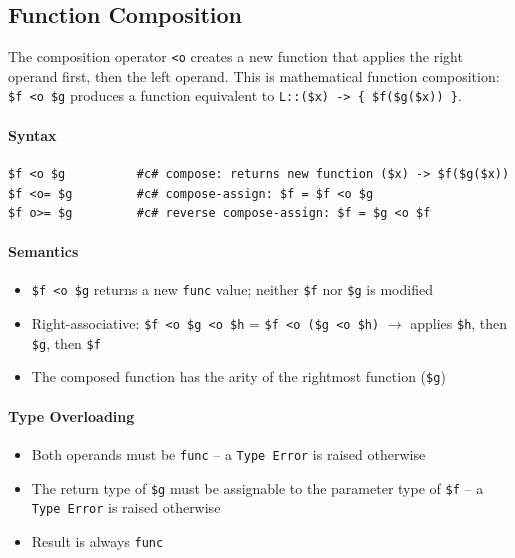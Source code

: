 \subsection{Function Composition}
The composition operator \texttt{<o} creates a new function that applies the right operand first, then the left operand. This is mathematical function composition: \texttt{\$f <o \$g} produces a function equivalent to \texttt{L::(\$x) -> \{ \$f(\$g(\$x)) \}}.

\paragraph{Syntax}
\begin{verbatim}
$f <o $g          #c# compose: returns new function ($x) -> $f($g($x))
$f <o= $g         #c# compose-assign: $f = $f <o $g
$f o>= $g         #c# reverse compose-assign: $f = $g <o $f
\end{verbatim}

\paragraph{Semantics}
\begin{itemize}
\item \texttt{\$f <o \$g} returns a new \texttt{func} value; neither \texttt{\$f} nor \texttt{\$g} is modified
\item Right-associative: \texttt{\$f <o \$g <o \$h} = \texttt{\$f <o (\$g <o \$h)} $\rightarrow$ applies \texttt{\$h}, then \texttt{\$g}, then \texttt{\$f}
\item The composed function has the arity of the rightmost function (\texttt{\$g})
\end{itemize}

\paragraph{Type Overloading}
\begin{itemize}
\item Both operands must be \texttt{func} -- a \texttt{Type Error} is raised otherwise
\item The return type of \texttt{\$g} must be assignable to the parameter type of \texttt{\$f} -- a \texttt{Type Error} is raised otherwise
\item Result is always \texttt{func}
\end{itemize}

